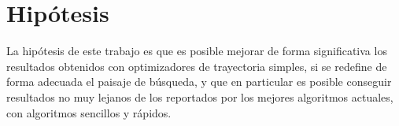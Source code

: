 \section{Hipótesis}

La hipótesis de este trabajo es que es posible mejorar de forma significativa los resultados obtenidos con optimizadores de trayectoria simples, 
si se redefine de forma adecuada el paisaje de búsqueda, y que en particular es posible conseguir resultados no muy lejanos de los reportados 
por los mejores algoritmos actuales, con algoritmos sencillos y rápidos.
